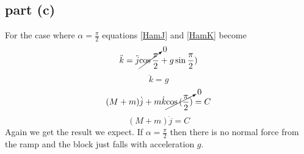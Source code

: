 \documentclass[11pt]{article}
\numberwithin{equation}{section}
\begin{document}
\subsection{part (c)}
For the case where $\alpha = \frac{\pi}{2}$ equations \ref{HamJ} and \ref{HamK} become
$$\ddot{k} = \ddot{j}\cancelto{0}{\cos{\frac{\pi}{2}}} + {g\sin{\frac{\pi}{2})}}$$
$$\ddot{k} = g$$
$$(M +m)\dot{j} +  m\dot{k}\cancelto{0}{\cos{(\frac{\pi}{2})}} = C$$
$$(M +m)\dot{j} = C$$
Again we get the result we expect. If $\alpha = \frac{\pi}{2}$ then there is no normal force from the ramp and the block just falls with acceleration $g$.
\end{document}
